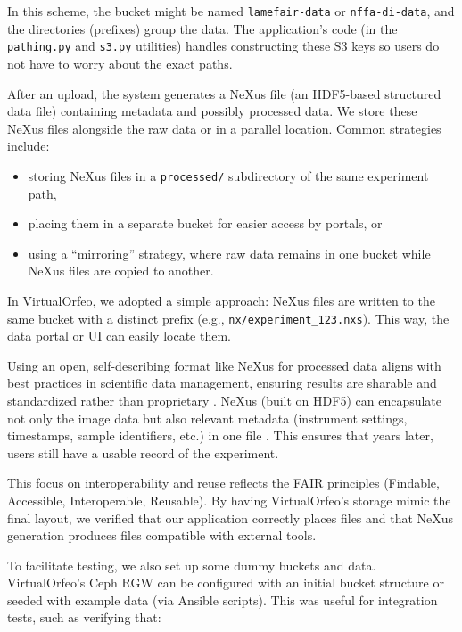In this scheme, the bucket might be named \texttt{lamefair-data} or 
\texttt{nffa-di-data}, and the directories (prefixes) group the data. The 
application’s code (in the \texttt{pathing.py} and \texttt{s3.py} utilities) 
handles constructing these S3 keys so users do not have to worry about the exact 
paths.

\medskip

After an upload, the system generates a NeXus file (an HDF5-based structured data 
file) containing metadata and possibly processed data. We store these NeXus files 
alongside the raw data or in a parallel location. Common strategies include:  

\begin{itemize}
	\item storing NeXus files in a \texttt{processed/} subdirectory of the same 
	experiment path,  
	\item placing them in a separate bucket for easier access by portals, or  
	\item using a ``mirroring'' strategy, where raw data remains in one bucket 
	while NeXus files are copied to another.  
\end{itemize}

In VirtualOrfeo, we adopted a simple approach: NeXus files are written to the 
same bucket with a distinct prefix (e.g., \texttt{nx/experiment\_123.nxs}). This 
way, the data portal or UI can easily locate them.

\medskip

Using an open, self-describing format like NeXus for processed data aligns with 
best practices in scientific data management, ensuring results are sharable and 
standardized rather than proprietary \parencite{Koennecke2015NeXusFormat, 
	Korir2024TenRecs}. NeXus (built on HDF5) can encapsulate not only the image data 
but also relevant metadata (instrument settings, timestamps, sample identifiers, 
etc.) in one file \parencite{Koennecke2015NeXusFormat}. This ensures that years 
later, users still have a usable record of the experiment.  

This focus on interoperability and reuse reflects the FAIR principles (Findable, 
Accessible, Interoperable, Reusable). By having VirtualOrfeo’s storage mimic the 
final layout, we verified that our application correctly places files and that 
NeXus generation produces files compatible with external tools.

\medskip

To facilitate testing, we also set up some dummy buckets and data. VirtualOrfeo’s 
Ceph RGW can be configured with an initial bucket structure or seeded with 
example data (via Ansible scripts). This was useful for integration tests, such 
as verifying that:  

